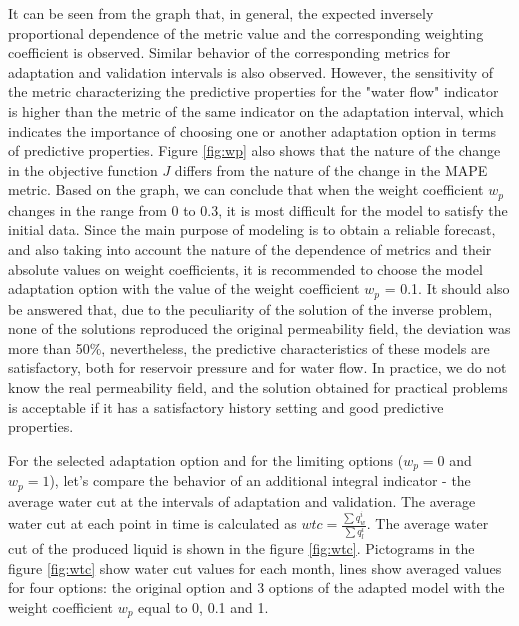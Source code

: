 \documentclass[
11pt,%
tightenlines,%
twoside,%
onecolumn,%
nofloats,%
nobibnotes,%
nofootinbib,%
superscriptaddress,%
noshowpacs,%
centertags]%
{revtex4}
\begin{document}
It can be seen from the graph that, in general, the expected inversely proportional dependence of the metric value and the corresponding weighting coefficient is observed. Similar behavior of the corresponding metrics for adaptation and validation intervals is also observed. However, the sensitivity of the metric characterizing the predictive properties for the "water flow" indicator is higher than the metric of the same indicator on the adaptation interval, which indicates the importance of choosing one or another adaptation option in terms of predictive properties. Figure \ref{fig:wp} also shows that the nature of the change in the objective function $J$ differs from the nature of the change in the MAPE metric. Based on the graph, we can conclude that when the weight coefficient $w_p$ changes in the range from 0 to 0.3, it is most difficult for the model to satisfy the initial data. Since the main purpose of modeling is to obtain a reliable forecast, and also taking into account the nature of the dependence of metrics and their absolute values on weight coefficients, it is recommended to choose the model adaptation option with the value of the weight coefficient $w_p$ = 0.1. It should also be answered that, due to the peculiarity of the solution of the inverse problem, none of the solutions reproduced the original permeability field, the deviation was more than 50\%, nevertheless, the predictive characteristics of these models are satisfactory, both for reservoir pressure and for water flow. In practice, we do not know the real permeability field, and the solution obtained for practical problems is acceptable if it has a satisfactory history setting and good predictive properties.

For the selected adaptation option and for the limiting options ($w_p = 0$ and $w_p = 1$), let's compare the behavior of an additional integral indicator - the average water cut at the intervals of adaptation and validation. The average water cut at each point in time is calculated as $wtc = \frac{\sum{q_w^i}}{\sum{q_l^i}}$. The average water cut of the produced liquid is shown in the figure \ref{fig:wtc}. Pictograms in the figure \ref{fig:wtc} show water cut values for each month, lines show averaged values for four options: the original option and 3 options of the adapted model with the weight coefficient $w_p$ equal to 0, 0.1 and 1.
\end{document}
